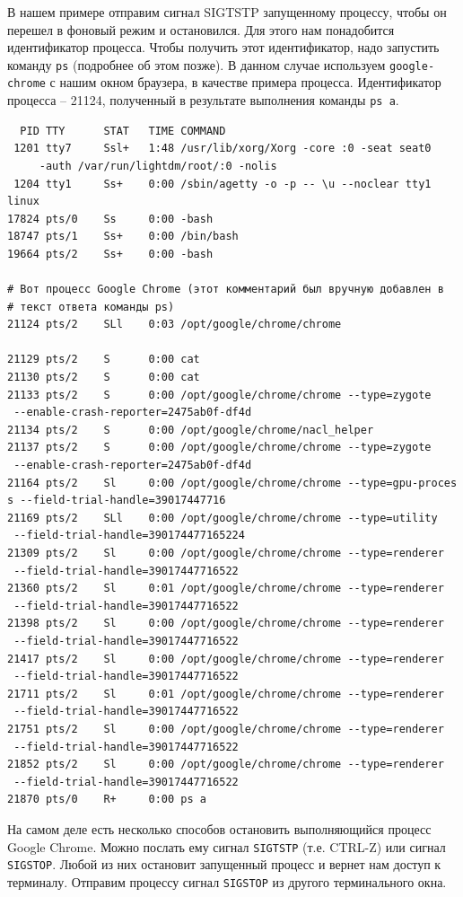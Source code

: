\documentclass[12pt]{article}
\begin{document}
В нашем примере отправим сигнал SIGTSTP запущенному процессу, чтобы он
перешел в фоновый режим и остановился. Для этого нам понадобится
идентификатор процесса. Чтобы получить этот идентификатор, надо
запустить команду \texttt{ps} (подробнее об этом позже). В данном случае
используем \texttt{google-chrome} с нашим окном браузера, в качестве
примера процесса. Идентификатор процесса -- 21124, полученный в
результате выполнения команды \texttt{ps\ a}.
\begin{verbatim}
  PID TTY      STAT   TIME COMMAND
 1201 tty7     Ssl+   1:48 /usr/lib/xorg/Xorg -core :0 -seat seat0
     -auth /var/run/lightdm/root/:0 -nolis
 1204 tty1     Ss+    0:00 /sbin/agetty -o -p -- \u --noclear tty1 linux
17824 pts/0    Ss     0:00 -bash
18747 pts/1    Ss+    0:00 /bin/bash
19664 pts/2    Ss+    0:00 -bash

# Вот процесс Google Chrome (этот комментарий был вручную добавлен в
# текст ответа команды ps)
21124 pts/2    SLl    0:03 /opt/google/chrome/chrome

21129 pts/2    S      0:00 cat
21130 pts/2    S      0:00 cat
21133 pts/2    S      0:00 /opt/google/chrome/chrome --type=zygote
 --enable-crash-reporter=2475ab0f-df4d
21134 pts/2    S      0:00 /opt/google/chrome/nacl_helper
21137 pts/2    S      0:00 /opt/google/chrome/chrome --type=zygote
 --enable-crash-reporter=2475ab0f-df4d
21164 pts/2    Sl     0:00 /opt/google/chrome/chrome --type=gpu-proces
s --field-trial-handle=39017447716
21169 pts/2    SLl    0:00 /opt/google/chrome/chrome --type=utility
 --field-trial-handle=390174477165224
21309 pts/2    Sl     0:00 /opt/google/chrome/chrome --type=renderer
 --field-trial-handle=39017447716522
21360 pts/2    Sl     0:01 /opt/google/chrome/chrome --type=renderer
 --field-trial-handle=39017447716522
21398 pts/2    Sl     0:00 /opt/google/chrome/chrome --type=renderer
 --field-trial-handle=39017447716522
21417 pts/2    Sl     0:00 /opt/google/chrome/chrome --type=renderer
 --field-trial-handle=39017447716522
21711 pts/2    Sl     0:01 /opt/google/chrome/chrome --type=renderer
 --field-trial-handle=39017447716522
21751 pts/2    Sl     0:00 /opt/google/chrome/chrome --type=renderer
 --field-trial-handle=39017447716522
21852 pts/2    Sl     0:00 /opt/google/chrome/chrome --type=renderer
 --field-trial-handle=39017447716522
21870 pts/0    R+     0:00 ps a
\end{verbatim}

На самом деле есть несколько способов остановить выполняющийся процесс
Google Chrome. Можно послать ему сигнал \texttt{SIGTSTP} (т.е. CTRL-Z) или
сигнал \texttt{SIGSTOP}. Любой из них остановит запущенный
процесс и вернет нам доступ к терминалу. Отправим процессу сигнал
\texttt{SIGSTOP} из другого терминального окна.
\end{document}
